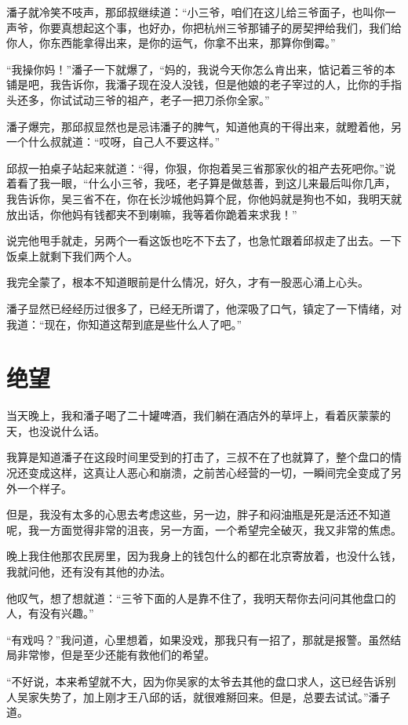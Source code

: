 潘子就冷笑不吱声，那邱叔继续道：“小三爷，咱们在这儿给三爷面子，也叫你一声爷，你要真想起这个事，也好办，你把杭州三爷那铺子的房契押给我们，我们给你人，你东西能拿得出来，是你的运气，你拿不出来，那算你倒霉。”

“我操你妈！”潘子一下就爆了，“妈的，我说今天你怎么肯出来，惦记着三爷的本铺是吧，我告诉你，我潘子现在没人没钱，但是他娘的老子宰过的人，比你的手指头还多，你试试动三爷的祖产，老子一把刀杀你全家。”

潘子爆完，那邱叔显然也是忌讳潘子的脾气，知道他真的干得出来，就瞪着他，另一个什么叔就道：“哎呀，自己人不要这样。”

邱叔一拍桌子站起来就道：“得，你狠，你抱着吴三省那家伙的祖产去死吧你。”说着看了我一眼，“什么小三爷，我呸，老子算是做慈善，到这儿来最后叫你几声，我告诉你，吴三省不在，你在长沙城他妈算个屁，你他妈就是狗也不如，我明天就放出话，你他妈有钱都夹不到喇嘛，我等着你跪着来求我！”

说完他甩手就走，另两个一看这饭也吃不下去了，也急忙跟着邱叔走了出去。一下饭桌上就剩下我们两个人。

我完全蒙了，根本不知道眼前是什么情况，好久，才有一股恶心涌上心头。

潘子显然已经经历过很多了，已经无所谓了，他深吸了口气，镇定了一下情绪，对我道：“现在，你知道这帮到底是些什么人了吧。”

\chapter{绝望}

当天晚上，我和潘子喝了二十罐啤酒，我们躺在酒店外的草坪上，看着灰蒙蒙的天，也没说什么话。

我算是知道潘子在这段时间里受到的打击了，三叔不在了也就算了，整个盘口的情况还变成这样，这真让人恶心和崩溃，之前苦心经营的一切，一瞬间完全变成了另外一个样子。

但是，我没有太多的心思去考虑这些，另一边，胖子和闷油瓶是死是活还不知道呢，我一方面觉得非常的沮丧，另一方面，一个希望完全破灭，我又非常的焦虑。

晚上我住他那农民房里，因为我身上的钱包什么的都在北京寄放着，也没什么钱，我就问他，还有没有其他的办法。

他叹气，想了想就道：“三爷下面的人是靠不住了，我明天帮你去问问其他盘口的人，有没有兴趣。”

“有戏吗？”我问道，心里想着，如果没戏，那我只有一招了，那就是报警。虽然结局非常惨，但是至少还能有救他们的希望。

“不好说，本来希望就不大，因为你吴家的太爷去其他的盘口求人，这已经告诉别人吴家失势了，加上刚才王八邱的话，就很难掰回来。但是，总要去试试。”潘子道。

